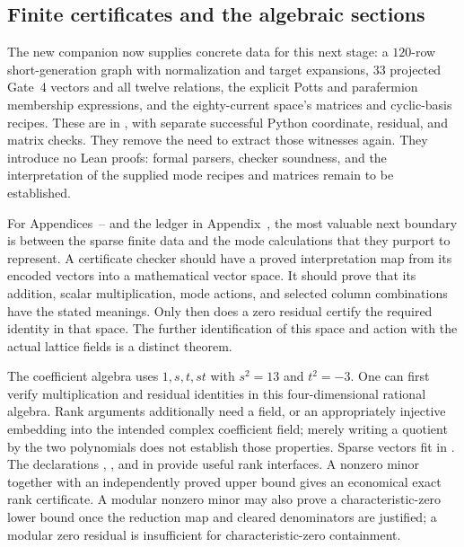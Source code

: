 \subsection{Finite certificates and the algebraic sections}

The new companion now supplies concrete data for this next stage:
a $120$-row short-generation graph with normalization and target
expansions, $33$ projected Gate~4 vectors and all twelve relations,
the explicit Potts and parafermion membership expressions, and the
eighty-current space's matrices and cyclic-basis recipes.  These are
in , with separate successful
Python coordinate, residual, and matrix checks.  They remove the
need to extract those witnesses again.  They introduce no Lean
proofs: formal parsers, checker soundness, and the interpretation
of the supplied mode recipes and matrices remain to be established.

For Appendices~--
and the ledger in Appendix~, the most valuable next boundary is
between the sparse finite data and the mode calculations that they
purport to represent. A certificate checker should have a proved
interpretation map from its encoded vectors into a mathematical vector
space. It should prove that its addition, scalar multiplication, mode
actions, and selected column combinations have the stated meanings.
Only then does a zero residual certify the required identity in that
space. The further identification of this space and action with the
actual lattice fields is a distinct theorem.

The coefficient algebra uses $1,s,t,st$ with $s^2=13$ and $t^2=-3$.
One can first verify multiplication and residual identities in this
four-dimensional rational algebra. Rank arguments additionally need
a field, or an appropriately injective embedding into the intended
complex coefficient field; merely writing a quotient by the two
polynomials does not establish those properties. Sparse vectors fit
 in
.
The declarations ,
, and
 in
 provide useful rank
interfaces. A nonzero minor together with an independently proved
upper bound gives an economical exact rank certificate. A modular
nonzero minor may also prove a characteristic-zero lower bound once
the reduction map and cleared denominators are justified; a modular
zero residual is insufficient for characteristic-zero containment.

